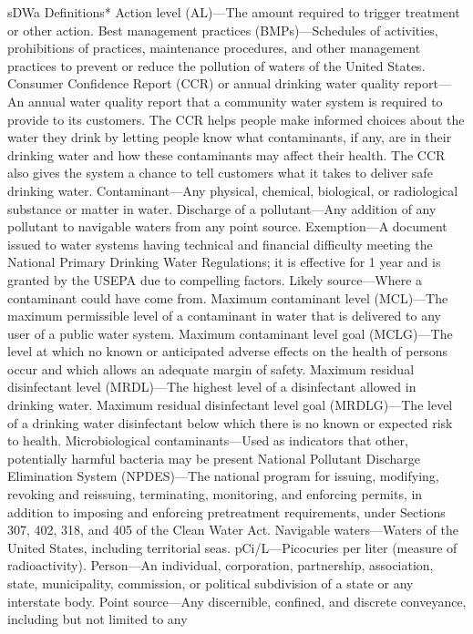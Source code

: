 \documentclass{article}
\begin{document}
sDWa Definitions* Action level (AL)---The amount required to trigger
treatment or other action. Best management practices (BMPs)---Schedules
of activities, prohibitions of practices, maintenance procedures, and
other management practices to prevent or reduce the pollution of waters
of the United States. Consumer Confidence Report (CCR) or annual
drinking water quality report---An annual water quality report that a
community water system is required to provide to its customers. The CCR
helps people make informed choices about the water they drink by letting
people know what contaminants, if any, are in their drinking water and
how these contaminants may affect their health. The CCR also gives the
system a chance to tell customers what it takes to deliver safe drinking
water. Contaminant---Any physical, chemical, biological, or radiological
substance or matter in water. Discharge of a pollutant---Any addition of
any pollutant to navigable waters from any point source. Exemption---A
document issued to water systems having technical and financial
difficulty meeting the National Primary Drinking Water Regulations; it
is effective for 1 year and is granted by the USEPA due to compelling
factors. Likely source---Where a contaminant could have come from.
Maximum contaminant level (MCL)---The maximum permissible level of a
contaminant in water that is delivered to any user of a public water
system. Maximum contaminant level goal (MCLG)---The level at which no
known or anticipated adverse effects on the health of persons occur and
which allows an adequate margin of safety. Maximum residual disinfectant
level (MRDL)---The highest level of a disinfectant allowed in drinking
water. Maximum residual disinfectant level goal (MRDLG)---The level of a
drinking water disinfectant below which there is no known or expected
risk to health. Microbiological contaminants---Used as indicators that
other, potentially harmful bacteria may be present National Pollutant
Discharge Elimination System (NPDES)---The national program for issuing,
modifying, revoking and reissuing, terminating, monitoring, and
enforcing permits, in addition to imposing and enforcing pretreatment
requirements, under Sections 307, 402, 318, and 405 of the Clean Water
Act. Navigable waters---Waters of the United States, including
territorial seas. pCi/L---Picocuries per liter (measure of
radioactivity). Person---An individual, corporation, partnership,
association, state, municipality, commission, or political subdivision
of a state or any interstate body. Point source---Any discernible,
confined, and discrete conveyance, including but not limited to any
\end{document}
